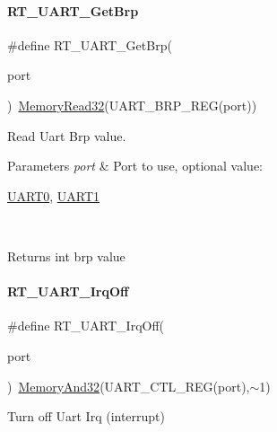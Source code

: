 \paragraph{\texorpdfstring{R\+T\+\_\+\+U\+A\+R\+T\+\_\+\+Get\+Brp}{RT\_UART\_GetBrp}}
{\footnotesize\ttfamily \#define R\+T\+\_\+\+U\+A\+R\+T\+\_\+\+Get\+Brp(\begin{DoxyParamCaption}\item[{}]{port }\end{DoxyParamCaption})~\mbox{\hyperlink{a00026_a2d484dc15bdf30ee11ab3b05f31f0e16}{Memory\+Read32}}(U\+A\+R\+T\+\_\+\+B\+R\+P\+\_\+\+R\+EG(port))}



Read Uart Brp value. 


\begin{DoxyParams}{Parameters}
{\em port} & Port to use, optional value\+:
\begin{DoxyCode}
\mbox{\hyperlink{a00098_a0508661f121639ffdee7de2353a0def2}{UART0}}, \mbox{\hyperlink{a00098_a8d69bf04d07af4fbbab5a8bd291f65ff}{UART1}}
\end{DoxyCode}
 \\
\hline
\end{DoxyParams}
\begin{DoxyReturn}{Returns}
int brp value 
\end{DoxyReturn}
\mbox{\label{a00098_acf04f21e0b0f598ac00a1a08eb4e5f2e}} 
\paragraph{\texorpdfstring{R\+T\+\_\+\+U\+A\+R\+T\+\_\+\+Irq\+Off}{RT\_UART\_IrqOff}}
{\footnotesize\ttfamily \#define R\+T\+\_\+\+U\+A\+R\+T\+\_\+\+Irq\+Off(\begin{DoxyParamCaption}\item[{}]{port }\end{DoxyParamCaption})~\mbox{\hyperlink{a00026_ad87cedffcaadc51db22594fce55173d4}{Memory\+And32}}(U\+A\+R\+T\+\_\+\+C\+T\+L\+\_\+\+R\+EG(port),$\sim$1)}



Turn off Uart Irq (interrupt) 


